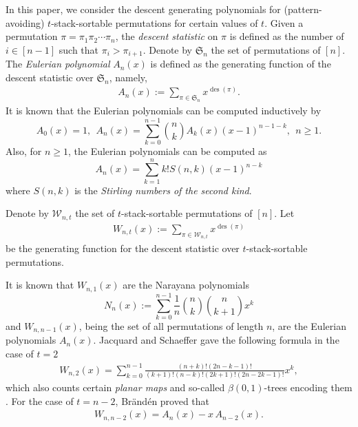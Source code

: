 \documentclass[11pt]{article}
\newcommand{\sortable}[2]{\ensuremath{\mathcal{W}_{#1,#2}}}
\newcommand{\+}{\mbox{\ensuremath{\scriptstyle{+}}}}
\DeclareMathOperator{\des}{des}
\begin{document}
In this paper, we consider the descent generating polynomials for (pattern-avoiding) $t$-stack-sortable permutations for certain values of $t$.
Given a permutation $\pi=\pi_1 \pi_2 \cdots \pi_n$,  the {\em descent statistic } on $\pi$ is defined as
the number of $i\in [n-1]$ such that $\pi_i > \pi_{i+1}$.
Denote by  $\mathfrak{S}_n$  the set of permutations of $[n]$.
The {\em Eulerian polynomial} $A_n(x)$ is defined as the  generating function  of the descent statistic over $\mathfrak{S}_n$, namely,
\begin{align*}
	A_n(x) := \sum_{\pi \in \mathfrak{S}_n}x^{\des (\pi)}.
\end{align*}
It is known that the Eulerian polynomials can be computed inductively by
$$A_0(x)=1, \ \ A_n(x)=\sum_{k=0}^{n-1}{n\choose k}A_k(x)(x-1)^{n-1-k},\ \ n\geq 1.$$
Also, for $n\geq 1$, the Eulerian polynomials can be computed as
$$A_n(x)=\sum_{k=1}^{n}k!S(n,k)(x-1)^{n-k}$$
where $S(n,k)$ is the {\em Stirling numbers of the second kind}.

Denote by $\sortable{n}{t}$ the set of $t$-stack-sortable permutations of $[n]$. Let
\begin{align*}
	W_{n,t}(x) := \sum_{\pi \in \sortable{n}{t}}x^{\des (\pi)}
\end{align*}
be the  generating function for the descent statistic over $t$-stack-sortable permutations.

It is  known that $W_{n,1}(x)$ are the  Narayana polynomials
$$N_n(x) := \sum_{k=0}^{n-1}\frac{1}{n}\binom{n}{k}\binom{n}{k+1}x^k$$ and $W_{n,n-1}(x)$, being the set of all permutations of length $n$,  are the Eulerian polynomials $A_n(x)$.
Jacquard and Schaeffer \cite{Jacquard1998bijective} gave the following formula in the case of $t=2$
\begin{align*}
	W_{n,2}(x)= \sum_{k=0}^{n-1}  \frac{(n+k)!(2n-k-1)!}{(k+1)!(n-k)!(2k+1)!(2n-2k-1)!} x^k,
\end{align*}
which also counts certain {\em planar maps} and so-called $\beta(0,1)$-trees encoding them \cite{Kitaev2011Patterns}.
For the case of $t=n-2$, Br{\"a}nd{\'e}n  \cite[Sec. 5]{Braenden2006linear} proved that
\begin{align}\label{n-2}
	W_{n,n-2}(x)=A_{n}(x)-x\, A_{n-2}(x).
\end{align}
\end{document}
